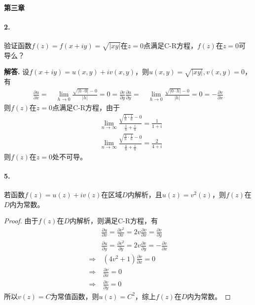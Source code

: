 \documentclass[12pt, a4paper, oneside]{ctexart}
\newenvironment{solution}{\par\noindent\textbf{解答. }}{\bigskip\par}
\begin{document}
\paragraph{第三章}
\paragraph{2.}验证函数$f(z)=f(x+iy)=\sqrt{|xy|}$在$z=0$点满足C-R方程，$f(z)$在$z=0$可导么？
\begin{solution}
    设$f(x+iy) = u(x,y)+iv(x,y)$，则$u(x,y) = \sqrt{|xy|}, v(x, y) = 0$，有
    \begin{equation*}
        \begin{aligned}
            \frac{\partial u}{\partial x} =&\ \lim_{h\rightarrow 0}\frac{\sqrt{|h\cdot 0|}-0}{|h|} = 0 = \frac{\partial v}{\partial y}
            \frac{\partial u}{\partial y} =&\ \lim_{h\rightarrow 0}\frac{\sqrt{|0\cdot h|}-0}{|h|} = 0 = -\frac{\partial v}{\partial x}
        \end{aligned}
    \end{equation*}
    则$f(z)$在$z = 0$点满足C-R方程，由于
    \begin{equation*}
        \begin{aligned}
            &\lim_{n\rightarrow \infty}\frac{\sqrt{\frac{1}{n}\cdot \frac{1}{n}}-0}{\frac{1}{n}+\frac{i}{n}} = \frac{1}{1+i}\\
            &\lim_{n\rightarrow \infty}\frac{\sqrt{\frac{4}{n}\cdot \frac{1}{n}}-0}{\frac{4}{n}+\frac{i}{n}} = \frac{2}{4+i}
        \end{aligned}
    \end{equation*}
    则$f(z)$在$z=0$处不可导。
\end{solution}
\paragraph{5.}若函数$f(z) = u(z)+iv(z)$在区域$D$内解析，且$u(z) = v^2(z)$，则$f(z)$在$D$内为常数。
\begin{proof}
    由于$f(z)$在$D$内解析，则满足C-R方程，有
    \begin{equation*}
        \begin{aligned}
            &\frac{\partial u}{\partial x} = \frac{\partial v^2}{\partial x} = 2v\frac{\partial v}{\partial x} = \frac{\partial v}{\partial y}\\
            &\frac{\partial u}{\partial y} = \frac{\partial v^2}{\partial y} = 2v\frac{\partial v}{\partial y} = -\frac{\partial v}{\partial x}\\
            \Rightarrow&\ (4v^2+1)\frac{\partial v}{\partial x} = 0\\
            \Rightarrow&\ \frac{\partial v}{\partial x} = 0\\
            \Rightarrow&\ \frac{\partial v}{\partial y} = 0
        \end{aligned}
    \end{equation*}
    所以$v(z) = C$为常值函数，则$u(z) = C^2$，综上$f(z)$在$D$内为常数。
\end{proof}
\end{document}
